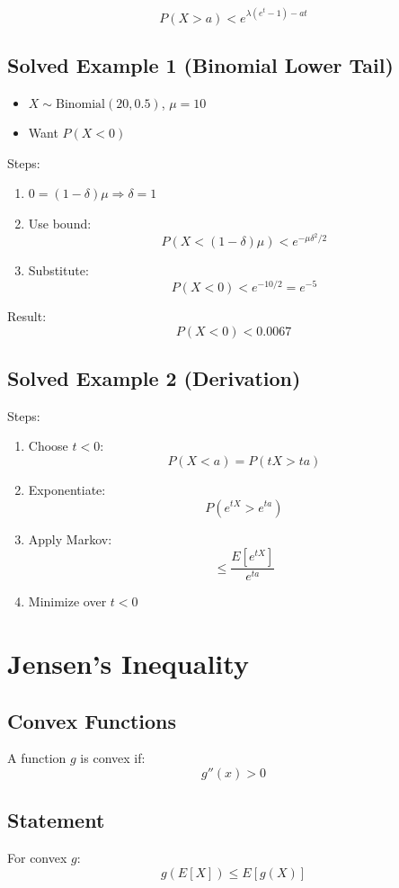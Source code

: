 \documentclass[11pt]{article}
\begin{document}
\[
P(X > a) < e^{\lambda(e^t - 1) - at}
\]

\subsection{Solved Example 1 (Binomial Lower Tail)}
\begin{itemize}
\item $X \sim \text{Binomial}(20, 0.5)$, $\mu = 10$
\item Want $P(X < 0)$
\end{itemize}

Steps:
\begin{enumerate}
\item $0 = (1 - \delta)\mu \Rightarrow \delta = 1$
\item Use bound:
\[
P(X < (1 - \delta)\mu) < e^{-\mu \delta^2 / 2}
\]
\item Substitute:
\[
P(X < 0) < e^{-10/2} = e^{-5}
\]
\end{enumerate}

Result:
\[
P(X < 0) < 0.0067
\]

\subsection{Solved Example 2 (Derivation)}
Steps:
\begin{enumerate}
\item Choose $t < 0$:
\[
P(X < a) = P(tX > ta)
\]
\item Exponentiate:
\[
P(e^{tX} > e^{ta})
\]
\item Apply Markov:
\[
\leq \frac{E[e^{tX}]}{e^{ta}}
\]
\item Minimize over $t < 0$
\end{enumerate}

\section{Jensen's Inequality}

\subsection{Convex Functions}
A function $g$ is convex if:
\[
g''(x) > 0
\]

\subsection{Statement}
For convex $g$:
\[
g(E[X]) \leq E[g(X)]
\]
\end{document}
